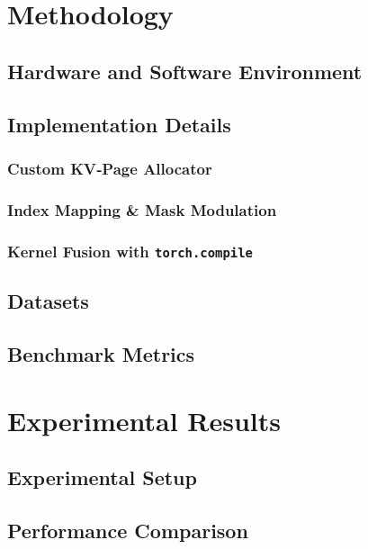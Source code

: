 \documentclass[11pt]{article}
\begin{document}
\section{Methodology}
  \subsection{Hardware and Software Environment}

  \subsection{Implementation Details}
  \subsubsection{Custom KV‑Page Allocator}
  \subsubsection{Index Mapping \& Mask Modulation}
  \subsubsection{Kernel Fusion with \texttt{torch.compile}}

  \subsection{Datasets}

  \subsection{Benchmark Metrics}

\section{Experimental Results}
  \subsection{Experimental Setup}

  \subsection{Performance Comparison}
\end{document}

